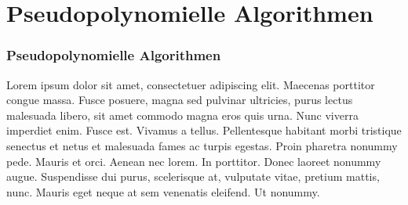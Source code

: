 \section{Pseudopolynomielle Algorithmen}

\begin{frame}
	\frametitle{Pseudopolynomielle Algorithmen}
	Lorem ipsum dolor sit amet, consectetuer adipiscing elit. Maecenas porttitor congue massa. Fusce posuere, magna sed pulvinar ultricies, purus lectus malesuada libero, sit amet commodo magna eros quis urna.
	Nunc viverra imperdiet enim. Fusce est. Vivamus a tellus.
	Pellentesque habitant morbi tristique senectus et netus et malesuada fames ac turpis egestas. Proin pharetra nonummy pede. Mauris et orci.
	Aenean nec lorem. In porttitor. Donec laoreet nonummy augue.
	Suspendisse dui purus, scelerisque at, vulputate vitae, pretium mattis, nunc. Mauris eget neque at sem venenatis eleifend. Ut nonummy.      
\end{frame}